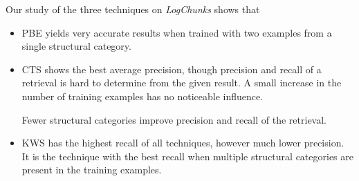 
Our study of the three techniques on \emph{LogChunks} shows that
\begin{itemize}
  \item PBE yields very accurate results when trained with two examples
  from a
  single structural category.
  \item CTS shows the best average precision, though precision and recall
  of a
  retrieval is hard to determine from the given result.
  A small increase in the number of training examples has no noticeable
  influence.

  Fewer structural categories improve precision and recall of the
  retrieval.
  \item KWS has the highest recall of all techniques, however much
  lower precision.
  It is the technique with the best recall when multiple structural
  categories
  are present in the training examples.
\end{itemize}


